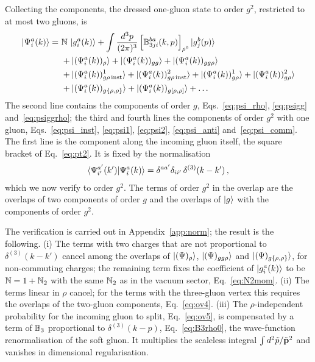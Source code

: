 Collecting the components, the dressed one-gluon state to order $g^2$, restricted to at most two gluons, is
\begin{align}\label{eq:psi_sum}
\ket{\Psi^a_i(k)}=\ &\mathbb{N}\,\ket{g^a_i(k)}+\int\frac{d^3p}{(2\pi)^3}\,\Big[\mathbb{B}^{ba}_{3ji}(k,p)\Big]_{\rho^0}\ket{g^b_j(p)}\notag\\
&+\ket{(\Psi^a_i(k))_\rho}+\ket{(\Psi^a_i(k))_{gg}}+\ket{(\Psi^a_i(k))_{gg\rho}}\notag\\
&+\ket{(\Psi^a_i(k))^1_{g\rho\,{\rm inst}}}+\ket{(\Psi^a_i(k))^2_{g\rho\,{\rm inst}}}+\ket{(\Psi^a_i(k))^1_{g\rho}}+\ket{(\Psi^a_i(k))^2_{g\rho}}\notag\\
&+\ket{(\Psi^a_i(k))_{g\{\rho,\rho\}}}+\ket{(\Psi^a_i(k))_{g[\rho,\rho]}}+\dots
\end{align}
The second line contains the components of order $g$, Eqs.~\eqref{eq:psi_rho}, \eqref{eq:psigg} and~\eqref{eq:psiggrho}; the third and fourth lines the components of order $g^2$ with one gluon, Eqs.~\eqref{eq:psi_inst}, \eqref{eq:psi1}, \eqref{eq:psi2}, \eqref{eq:psi_anti} and~\eqref{eq:psi_comm}. The first line is the component along the incoming gluon itself, the square bracket of Eq.~\eqref{eq:pt2}. It is fixed by the normalisation
\begin{align}\label{eq:normcond}
\braket{\Psi^{a'}_{i'}(k')|\Psi^a_i(k)}=\delta^{aa'}\delta_{ii'}\,\delta^{(3)}(k-k')\,,
\end{align}
which we now verify to order $g^2$. The terms of order $g^2$ in the overlap are the overlaps of two components of order $g$ and the overlaps of $\ket{g}$ with the components of order $g^2$.

The verification is carried out in Appendix~\ref{app:norm}; the result is the following. (i) The terms with two charges that are not proportional to $\delta^{(3)}(k-k')$ cancel among the overlaps of $\ket{(\Psi)_\rho}$, $\ket{(\Psi)_{gg\rho}}$ and $\ket{(\Psi)_{g\{\rho,\rho\}}}$, for non-commuting charges; the remaining term fixes the coefficient of $\ket{g^a_i(k)}$ to be $\mathbb{N}=1+\mathbb{N}_2$ with the same $\mathbb{N}_2$ as in the vacuum sector, Eq.~\eqref{eq:N2mom}. (ii) The terms linear in $\rho$ cancel; for the terms with the three-gluon vertex this requires the overlaps of the two-gluon components, Eq.~\eqref{eq:ov4}. (iii) The $\rho$-independent probability for the incoming gluon to split, Eq.~\eqref{eq:ov5}, is compensated by a term of $\mathbb{B}_3$ proportional to $\delta^{(3)}(k-p)$, Eq.~\eqref{eq:B3rho0}, the wave-function renormalisation of the soft gluon. It multiplies the scaleless integral $\int d^2\tilde p/\tilde{\mathbf{p}}^2$ and vanishes in dimensional regularisation.

